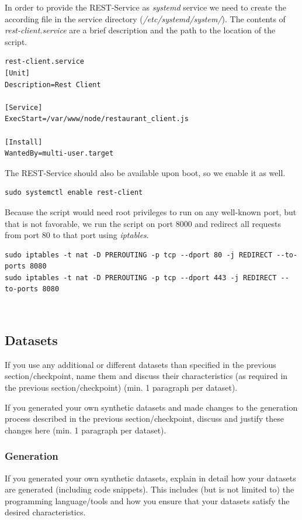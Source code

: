 In order to provide the REST-Service as \textit{systemd} service we need to create the according file in the service directory (\textit{/etc/systemd/system/}). The contents of \textit{rest-client.service} are a brief description and the path to the location of the script.
\begin{lstlisting}
rest-client.service
[Unit]
Description=Rest Client

[Service]
ExecStart=/var/www/node/restaurant_client.js

[Install]
WantedBy=multi-user.target
\end{lstlisting}

The REST-Service should also be available upon boot, so we enable it as well.
\begin{lstlisting}
sudo systemctl enable rest-client
\end{lstlisting}

Because the script would need root privileges to run on any well-known port, but that is not favorable, we run the script on port 8000 and redirect all requests from port 80 to that port using \textit{iptables}.
\begin{lstlisting}
sudo iptables -t nat -D PREROUTING -p tcp --dport 80 -j REDIRECT --to-ports 8080
sudo iptables -t nat -D PREROUTING -p tcp --dport 443 -j REDIRECT --to-ports 8080
\end{lstlisting}

\

\subsection{Datasets}

If you use any additional or different datasets than specified in the previous
section/checkpoint, name them and discuss their characteristics (as required in
the previous section/checkpoint) (min. 1 paragraph per dataset).

If you generated your own synthetic datasets and made changes to the generation
process described in the previous section/checkpoint, discuss and justify these
changes here (min. 1 paragraph per dataset).

\subsubsection{Generation}

If you generated your own synthetic datasets, explain in detail how your
datasets are generated (including code snippets). This includes (but is not
limited to) the programming language/tools and how you ensure that your datasets
satisfy the desired characteristics.

